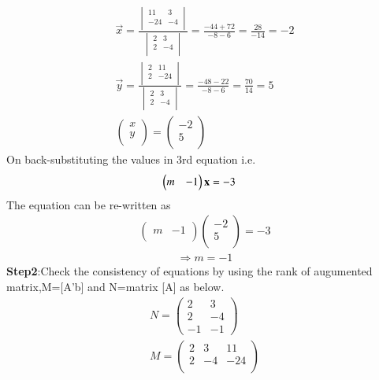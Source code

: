 \documentclass[journal,12pt,twocolumn]{IEEEtran}
\begin{document}
\begin{align*}
\vec{x}=\frac{\begin{vmatrix}11 & 3\\-24 & -4\\\end{vmatrix}}{\begin{vmatrix}2 & 3\\2 & -4\\\end{vmatrix}}=\frac{-44+72}{-8-6}=\frac{28}{-14}=-2\\
\vec{y}=\frac{\begin{vmatrix}2 & 11\\2 & -24\\\end{vmatrix}}{\begin{vmatrix}2 & 3\\2 & -4\\\end{vmatrix}}=\frac{-48-22}{-8-6}=\frac{70}{14}=5\\
\begin{pmatrix}x\\y\\\end{pmatrix}=\begin{pmatrix}-2\\5\\\end{pmatrix}
\end{align*}
On back-substituting the values in 3rd equation i.e.\\
\begin{align}
\begin{pmatrix}m & -1 \end{pmatrix}\mathbf{x}&=-3
\end{align}
The equation can be re-written as\\
\begin{align*}
\begin{pmatrix}m & -1\\\end{pmatrix} \begin{pmatrix}-2\\5\\\end{pmatrix}=-3
\end{align*}
\begin{align}
\Rightarrow m=-1
\end{align}
\textbf{Step2}:Check the consistency of equations by using the rank of augumented matrix,M=[A'b] and N=matrix [A] as below.
\begin{align*}
N=\begin{pmatrix}2 & 3\\2 & -4\\-1 & -1\end{pmatrix}\\
M=\begin{pmatrix}2 & 3 & 11\\2 & -4 & -24\\\end{pmatrix}\\
\end{align*}
\end{document}
